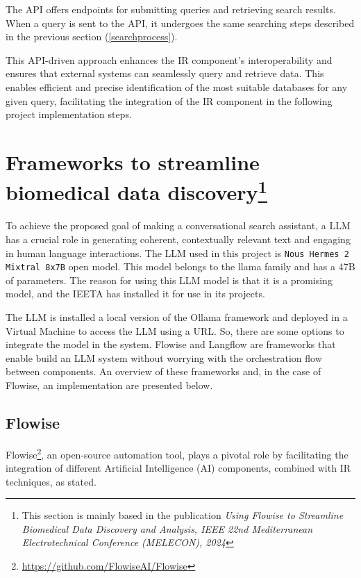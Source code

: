 The API offers endpoints for submitting queries and retrieving search results. When a query is sent to the API, it undergoes the same searching steps described in the previous section (\ref{searchprocess}).

This API-driven approach enhances the IR component's interoperability and ensures that external systems can seamlessly query and retrieve data. This enables efficient and precise identification of the most suitable databases for any given query, facilitating the integration of the IR component in the following project implementation steps.


\section{Frameworks to streamline biomedical data discovery\protect\footnote{This section is mainly based in the publication \textit{Using Flowise to Streamline Biomedical Data Discovery and Analysis, IEEE 22nd Mediterranean Electrotechnical Conference (MELECON), 2024}}}

To achieve the proposed goal of making a conversational search assistant, a LLM has a crucial role in generating coherent, contextually relevant text and engaging in human language interactions. The LLM used in this project is \texttt{Nous Hermes 2 Mixtral 8x7B} open model. This model belongs to the llama family and has a 47B of parameters. The reason for using this LLM model is that it is a promising model, and the IEETA has installed it for use in its projects.

The LLM is installed a local version of the Ollama framework and deployed in a Virtual Machine to access the LLM using a URL. So, there are some options to integrate the model in the system. Flowise and Langflow are frameworks that enable build an LLM system without worrying with the orchestration flow between components. An overview of these frameworks and, in the case of Flowise, an implementation are presented below.


\subsection{Flowise}

Flowise\footnote{\url{https://github.com/FlowiseAI/Flowise}}, an open-source automation tool, plays a pivotal role by facilitating the integration of different Artificial Intelligence (AI) components, combined with IR techniques, as \citet{reis2024flowise} stated.

